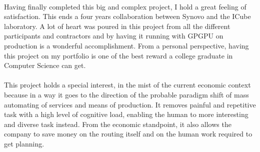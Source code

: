 \documentclass[12pt]{memoir}
\begin{document}
\\
Having finally completed this big and complex project, I hold a great feeling of satisfaction.
This ends a four years collaboration between Synovo and the ICube laboratory. A lot of heart was poured in this project from
all the different participants and contractors and by having it running with GPGPU on production is a wonderful accomplishment.
From a personal perspective, having this project on my portfolio is one of the best reward a college graduate in Computer Science can get.\\
\\
This project holds a special interest, in the mist of the current economic context because in a way it goes to the direction
of the probable paradigm shift of mass automating of services and means of production. It removes painful and repetitive task
with a high level of cognitive load, enabling the human to more interesting and diverse task instead.
From the economic standpoint, it also allows the company to save money on the routing itself and on the human work required to get planning. \\



\end{document}
